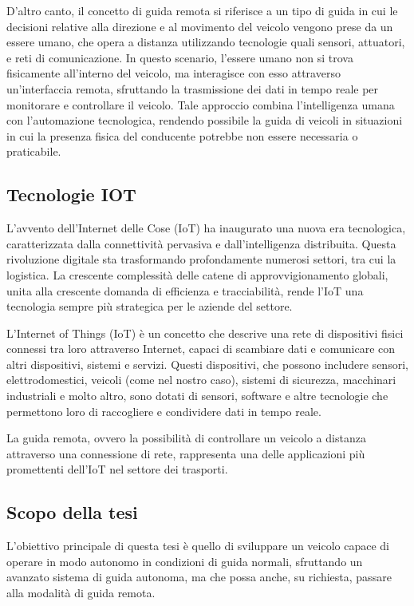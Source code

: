 \noindent D'altro canto, il concetto di guida remota si riferisce a un tipo di guida in cui le decisioni relative alla direzione e al movimento del veicolo vengono prese da un essere umano, che opera a distanza utilizzando tecnologie quali sensori, attuatori, e reti di comunicazione. In questo scenario, l'essere umano non si trova fisicamente all'interno del veicolo, ma interagisce con esso attraverso un'interfaccia remota, sfruttando la trasmissione dei dati in tempo reale per monitorare e controllare il veicolo. Tale approccio combina l'intelligenza umana con l'automazione tecnologica, rendendo possibile la guida di veicoli in situazioni in cui la presenza fisica del conducente potrebbe non essere necessaria o praticabile.

\subsection{Tecnologie IOT}
L'avvento dell'Internet delle Cose (IoT) ha inaugurato una nuova era tecnologica, caratterizzata dalla connettività pervasiva e dall'intelligenza distribuita. Questa rivoluzione digitale sta trasformando profondamente numerosi settori, tra cui la logistica. La crescente complessità delle catene di approvvigionamento globali, unita alla crescente domanda di efficienza e tracciabilità, rende l'IoT una tecnologia sempre più strategica per le aziende del settore.

\noindent L'Internet of Things (IoT) è un concetto che descrive una rete di dispositivi fisici connessi tra loro attraverso Internet, capaci di scambiare dati e comunicare con altri dispositivi, sistemi e servizi. Questi dispositivi, che possono includere sensori, elettrodomestici, veicoli (come nel nostro caso), sistemi di sicurezza, macchinari industriali e molto altro, sono dotati di sensori, software e altre tecnologie che permettono loro di raccogliere e condividere dati in tempo reale.

\noindent La guida remota, ovvero la possibilità di controllare un veicolo a distanza attraverso una connessione di rete, rappresenta una delle applicazioni più promettenti dell'IoT nel settore dei trasporti.

\subsection{Scopo della tesi}
L'obiettivo principale di questa tesi è quello di sviluppare un veicolo capace di operare in modo autonomo in condizioni di guida normali, sfruttando un avanzato sistema di guida autonoma, ma che possa anche, su richiesta, passare alla modalità di guida remota.

